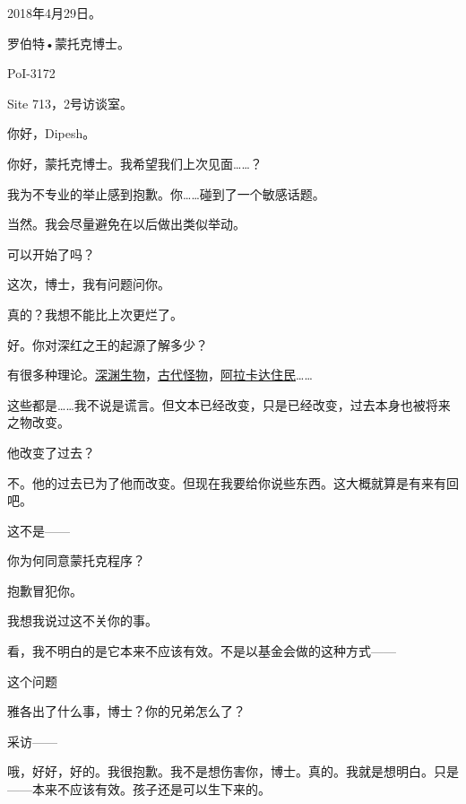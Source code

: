 \begin{scpbox}

2018年4月29日。

罗伯特•蒙托克博士。

PoI-3172

Site 713，2号访谈室。


你好，Dipesh。

你好，蒙托克博士。我希望我们上次见面……？

我为不专业的举止感到抱歉。你……碰到了一个敏感话题。

当然。我会尽量避免在以后做出类似举动。

可以开始了吗？

这次，博士，我有问题问你。

真的？我想不能比上次更烂了。

好。你对深红之王的起源了解多少？

有很多种理论。\hyperref[chap:]{深渊生物}，\hyperref[chap:]{古代怪物}，\hyperref[chap:]{阿拉卡达住民}……

这些都是……我不说是谎言。但文本已经改变，只是已经改变，过去本身也被将来之物改变。

他改变了过去？

不。他的过去已为了他而改变。但现在我要给你说些东西。这大概就算是有来有回吧。

这不是——

你为何同意蒙托克程序？


抱歉冒犯你。

我想我说过这不关你的事。

看，我不明白的是它本来不应该有效。不是以基金会做的这种方式——

这个问题

雅各出了什么事，博士？你的兄弟怎么了？

采访——

哦，好好，好的。我很抱歉。我不是想伤害你，博士。真的。我就是想明白。只是——本来不应该有效。孩子还是可以生下来的。



\end{scpbox}
